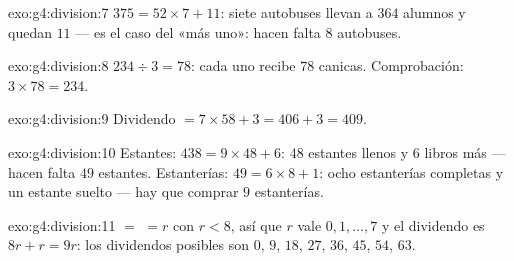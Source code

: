 \begin{solution}{exo:g4:division:7}
$375 = 52 \times 7 + 11$: siete autobuses llevan a $364$ alumnos y quedan $11$
--- es el caso del «más uno»: hacen falta $8$ autobuses.
\end{solution}

\begin{solution}{exo:g4:division:8}
$234 \div 3 = 78$: cada uno recibe $78$ canicas. Comprobación:
$3 \times 78 = 234$.
\end{solution}

\begin{solution}{exo:g4:division:9}
Dividendo $= 7 \times 58 + 3 = 406 + 3 = 409$.
\end{solution}

\begin{solution}{exo:g4:division:10}
Estantes: $438 = 9 \times 48 + 6$: $48$ estantes llenos y $6$ libros
más --- hacen falta $49$ estantes. Estanterías:
$49 = 6 \times 8 + 1$: ocho estanterías completas y un estante suelto ---
hay que comprar $9$ estanterías.
\end{solution}

\begin{solution}{exo:g4:division:11}
 $=$  $= r$ con $r < 8$, así que $r$ vale $0, 1, \dots,
7$ y el dividendo es $8r + r = 9r$: los dividendos posibles son
$0$, $9$, $18$, $27$, $36$, $45$, $54$, $63$.
\end{solution}
